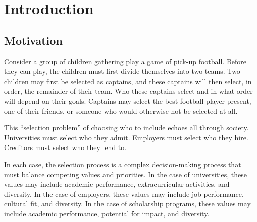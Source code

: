 

\chapter{\label{ch:intro}Introduction} 

\minitoc

\section{Motivation}
Consider a group of children gathering play a game of pick-up football. Before they can play, the children must first divide themselves into two teams. Two children may first be selected as captains, and these captains will then select, in order, the remainder of their team. Who these captains select and in what order will depend on their goals. Captains may select the best football player present, one of their friends, or someone who would otherwise not be selected at all.

This ``selection problem'' of choosing who to include echoes all through society. Universities must select who they admit. Employers must select who they hire. Creditors must select who they lend to. 

In each case, the selection process is a complex decision-making process that must balance competing values and priorities. In the case of universities, these values may include academic performance, extracurricular activities, and diversity. In the case of employers, these values may include job performance, cultural fit, and diversity. In the case of scholarship programs, these values may include academic performance, potential for impact, and diversity.




